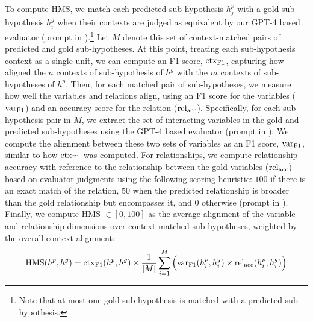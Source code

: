 To compute HMS, we match each predicted sub-hypothesis $h^p_j$ with a gold sub-hypothesis $h^g_i$ when their contexts are judged as equivalent by our GPT-4 based evaluator (prompt in ).\footnote{Note that at most one gold sub-hypothesis is matched with a predicted sub-hypothesis.} Let $M$ denote this set of context-matched pairs of predicted and gold sub-hypotheses. At this point, treating each sub-hypothesis context as a single unit, we can compute an F1 score, $\mathrm{ctx}_\mathrm{F1}$, capturing how aligned the $n$ contexts of sub-hypothesis of $h^g$ with the $m$ contexts of sub-hypotheses of $h^p$. Then, for each matched pair of sub-hypotheses, we measure how well the variables and relations align, using an F1 score for the variables ($\mathrm{var}_\mathrm{F1}$) and an accuracy score for the relation ($\mathrm{rel}_\mathrm{acc}$).
Specifically, for each sub-hypothesis pair in $M$, we extract the set of interacting variables
in the gold and predicted sub-hypotheses using the GPT-4 based evaluator (prompt in ). We compute the alignment between these two sets of variables as an F1 score, $\mathrm{var}_\mathrm{F1}$, similar to how $\mathrm{ctx}_\mathrm{F1}$ was computed. For relationships, we compute relationship accuracy with reference to the relationship between the gold variables
($\mathrm{rel}_\mathrm{acc}$) based on evaluator judgments using the following scoring heuristic: $100$ if there is an exact match of the relation, $50$ when the predicted relationship is broader than the gold relationship but encompasses it, and $0$ otherwise (prompt in ).
Finally, we compute HMS $\in [0, 100]$ as the average alignment of the variable and relationship dimensions over context-matched sub-hypotheses, weighted by the overall context alignment:
\[
    \mathrm{HMS}(h^p, h^g) = \mathrm{ctx}_\mathrm{F1}(h^p, h^g) \times \frac{1}{|M|} \sum_{i=1}^{|M|} \Big( \mathrm{var}_\mathrm{F1}(h^p_i, h^g_i) \times \mathrm{rel}_\mathrm{acc}(h^p_i, h^g_i) \Big)
\]

